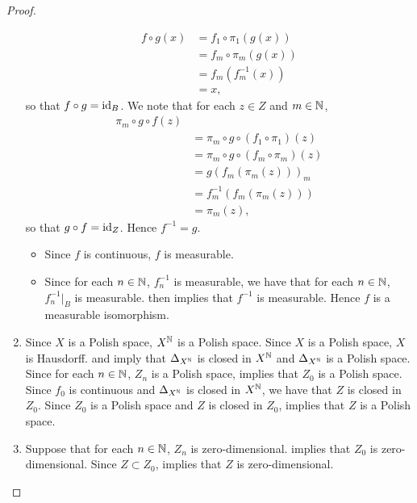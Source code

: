 \documentclass{book}
\begin{document}
\begin{proof}
\begin{enumerate}
			\begin{align*}
				f \circ g (x)
				& = f_1 \circ \pi_1(g(x)) \\
				& = f_m \circ \pi_m(g(x)) \\
				& = f_m (f_m^{-1}(x)) \\
				& = x,
			\end{align*} 
			so that $f \circ g = \operatorname{id}_B$. We note that for each $z \in Z$ and $m \in \mathbb{N}$,
			\begin{align*}
				\pi_m \circ g \circ f(z) \\
				& = \pi_m \circ g \circ (f_1 \circ \pi_1)(z) \\
				& = \pi_m \circ g \circ (f_m \circ \pi_m)(z) \\
				& = g(f_m ( \pi_m(z)))_m \\
				& = f_m^{-1}(f_m ( \pi_m(z))) \\
				& = \pi_m(z),
			\end{align*} 
			so that $g \circ f = \operatorname{id}_Z$. Hence $f^{-1} = g$.
			\begin{itemize}
				\item Since $f$ is continuous, $f$ is measurable. 
				\item Since for each $n \in \mathbb{N}$, $f_n^{-1}$ is measurable, we have that for each $n \in \mathbb{N}$, $f_n^{-1}|_B$ is measurable.  then implies that $f^{-1}$ is measurable. Hence $f$ is a measurable isomorphism.  
			\end{itemize} 
			\item Since $X$ is a Polish space, $X^{\mathbb{N}}$ is a Polish space. Since $X$ is a Polish space, $X$ is Hausdorff.  and  imply that $\Delta_{X^{\mathbb{N}}}$ is closed in $X^{\mathbb{N}}$ and $\Delta_{X^{\mathbb{N}}}$ is a Polish space. Since for each $n \in \mathbb{N}$, $Z_n$ is a Polish space,  implies that $Z_0$ is a Polish space. Since $f_0$ is continuous and $\Delta_{X^{\mathbb{N}}}$ is closed in $X^{\mathbb{N}}$, we have that $Z$ is closed in $Z_0$. Since $Z_0$ is a Polish space and $Z$ is closed in $Z_0$,  implies that $Z$ is a Polish space. 
			\item Suppose that for each $n \in \mathbb{N}$, $Z_n$ is zero-dimensional.  implies that $Z_0$ is zero-dimensional. Since $Z \subset Z_0$,  implies that $Z$ is zero-dimensional.
		\end{enumerate}
	\end{proof}
\end{document}
